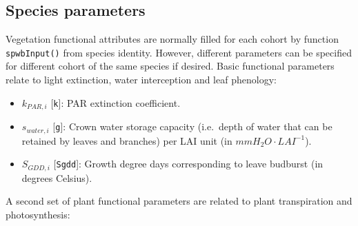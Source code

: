 \documentclass[]{book}
\providecommand{\tightlist}{%
  \setlength{\itemsep}{0pt}\setlength{\parskip}{0pt}}
\begin{document}
\hypertarget{species-parameters}{%
\subsection{Species parameters}\label{species-parameters}}

Vegetation functional attributes are normally filled for each cohort by function \texttt{spwbInput()} from species identity. However, different parameters can be specified for different cohort of the same species if desired. Basic functional parameters relate to light extinction, water interception and leaf phenology:

\begin{itemize}
\tightlist
\item
  \(k_{PAR,i}\) {[}\texttt{k}{]}: PAR extinction coefficient.
\item
  \(s_{water, i}\) {[}\texttt{g}{]}: Crown water storage capacity (i.e.~depth of
  water that can be retained by leaves and branches) per LAI unit (in \(mmH_2O·LAI^{-1}\)).
\item
  \(S_{GDD,i}\) {[}\texttt{Sgdd}{]}: Growth degree days corresponding to leave
  budburst (in degrees Celsius).
\end{itemize}

A second set of plant functional parameters are related to plant transpiration and photosynthesis:
\end{document}
